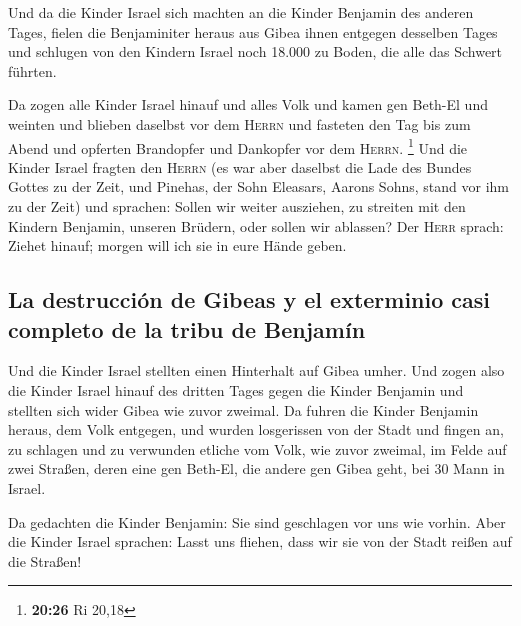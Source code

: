  Und da die Kinder Israel sich machten an die Kinder
Benjamin des anderen Tages,  fielen die Benjaminiter
heraus aus Gibea ihnen entgegen desselben Tages und schlugen von den
Kindern Israel noch 18.000 zu Boden, die alle das Schwert führten.

 Da zogen alle Kinder Israel hinauf und alles Volk und
kamen gen Beth-El und weinten und blieben daselbst vor dem
\textsc{Herrn} und fasteten den Tag bis zum Abend und opferten
Brandopfer und Dankopfer vor dem \textsc{Herrn}. \footnote{\textbf{20:26}
  Ri 20,18}  Und die Kinder Israel fragten den
\textsc{Herrn} (es war aber daselbst die Lade des Bundes Gottes zu der
Zeit,  und Pinehas, der Sohn Eleasars, Aarons Sohns,
stand vor ihm zu der Zeit) und sprachen: Sollen wir weiter ausziehen, zu
streiten mit den Kindern Benjamin, unseren Brüdern, oder sollen wir
ablassen? Der \textsc{Herr} sprach: Ziehet hinauf; morgen will ich sie
in eure Hände geben.

\hypertarget{la-destrucciuxf3n-de-gibeas-y-el-exterminio-casi-completo-de-la-tribu-de-benjamuxedn}{%
\subsection{La destrucción de Gibeas y el exterminio casi completo de la
tribu de
Benjamín}\label{la-destrucciuxf3n-de-gibeas-y-el-exterminio-casi-completo-de-la-tribu-de-benjamuxedn}}

 Und die Kinder Israel stellten einen Hinterhalt auf
Gibea umher.  Und zogen also die Kinder Israel hinauf des
dritten Tages gegen die Kinder Benjamin und stellten sich wider Gibea
wie zuvor zweimal.  Da fuhren die Kinder Benjamin heraus,
dem Volk entgegen, und wurden losgerissen von der Stadt und fingen an,
zu schlagen und zu verwunden etliche vom Volk, wie zuvor zweimal, im
Felde auf zwei Straßen, deren eine gen Beth-El, die andere gen Gibea
geht, bei 30 Mann in Israel.

 Da gedachten die Kinder Benjamin: Sie sind geschlagen
vor uns wie vorhin. Aber die Kinder Israel sprachen: Lasst uns fliehen,
dass wir sie von der Stadt reißen auf die Straßen!

